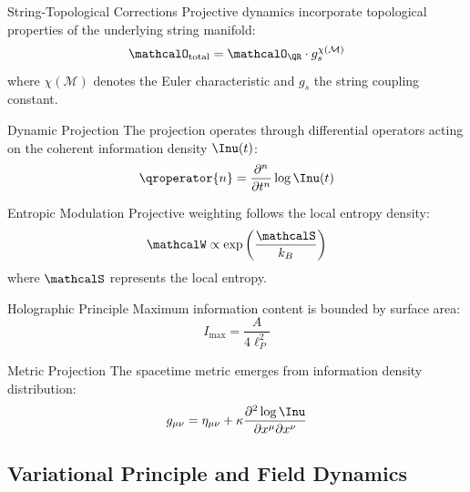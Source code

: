 \begin{qraxiom}{String-Topological Corrections}
Projective dynamics incorporate topological properties of the underlying string manifold:
\begin{equation}
\mathcalO_{\text{total}} = \mathcalO_{\QR} \cdot g_s^{\chi(\mathcal{M})}
\label{eq:axiom4}
\end{equation}
where $\chi(\mathcal{M})$ denotes the Euler characteristic and $g_s$ the string coupling constant.
\end{qraxiom}

\begin{qraxiom}{Dynamic Projection}
The projection operates through differential operators acting on the coherent information density $\Inu(t)$:
\begin{equation}
\qroperator{n} = \frac{\partial^n}{\partial t^n} \log \Inu(t)
\label{eq:axiom5}
\end{equation}
\end{qraxiom}

\begin{qraxiom}{Entropic Modulation}
Projective weighting follows the local entropy density:
\begin{equation}
\mathcalW \propto \exp\left(\frac{\mathcalS}{k_B}\right)
\label{eq:axiom6}
\end{equation}
where $\mathcalS$ represents the local entropy.
\end{qraxiom}

\begin{qraxiom}{Holographic Principle}
Maximum information content is bounded by surface area:
\begin{equation}
I_{\max} = \frac{A}{4\ell_P^2}
\label{eq:axiom7}
\end{equation}
\end{qraxiom}

\begin{qraxiom}{Metric Projection}
The spacetime metric emerges from information density distribution:
\begin{equation}
g_{\mu\nu} = \eta_{\mu\nu} + \kappa \frac{\partial^2 \log \Inu}{\partial x^\mu \partial x^\nu}
\label{eq:axiom8}
\end{equation}
\end{qraxiom}

\subsection{Variational Principle and Field Dynamics}
\label{subsec:variational-principle}

